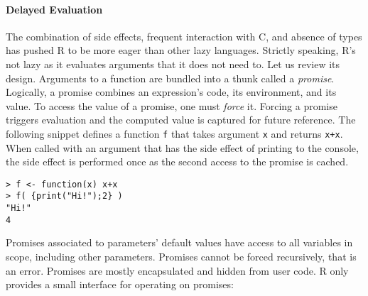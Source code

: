 \documentclass[review,nonacm,screen,acmsmall,anonymous=true]{acmart}
\newcommand{\authorcomment}[3]{}
\newcommand{\SK}[1]{\authorcomment{yellow}{SK}{#1}}
\newcommand{\code}[1]{\lstinline |#1|\xspace}
\begin{document}
\paragraph{Delayed Evaluation}

The combination of side effects, frequent interaction with C, and absence of
types has pushed R to be more eager than other lazy languages. Strictly
speaking, R's not lazy as it evaluates arguments that it does not need to.\SK{I didn't understand previous sentence}  Let
us review its design. Arguments to a function are bundled into a thunk called a
\emph{promise}. Logically, a promise combines an expression's code, its
environment, and its value. To access the value of a promise, one must
\emph{force} it. Forcing a promise triggers evaluation and the computed value is
captured for future reference. The following snippet defines a function \code{f}
that takes argument \code x and returns \code{x+x}. When called with an argument
that has the side effect of printing to the console, the side effect is
performed once as the second access to the promise is cached.
\begin{lstlisting}
> f <- function(x) x+x
> f( {print("Hi!");2} )
"Hi!"
4
\end{lstlisting}

\noindent
Promises associated to parameters' default values have access to all variables
in scope, including other parameters. Promises cannot be forced recursively,
that is an error. Promises are mostly encapsulated and hidden from user code. R
only provides a small interface for operating on promises:
\end{document}
